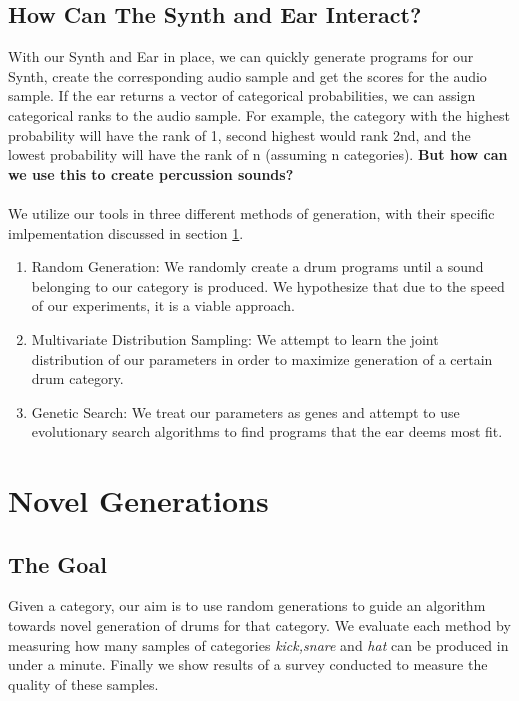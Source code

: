 \documentclass{nime-alternate} %
\begin{document}
\subsection{How Can The Synth and Ear Interact?}
With our Synth and Ear in place, we can quickly generate programs for our Synth, create the corresponding audio sample and get the scores for the audio sample. If the ear returns a vector of categorical probabilities, we can assign categorical ranks to the audio sample. For example, the category with the highest probability will have the rank of 1, second highest would rank 2nd, and the lowest probability will have the rank of n (assuming n categories).\textbf{
But how can we use this to create percussion sounds?}\\\\
We utilize our tools in three different methods of generation, with their specific imlpementation discussed in section \ref{gens}.
\begin {enumerate} [label=(\roman*)]
\item Random Generation: We randomly create a drum programs until a sound belonging to our category is produced. We hypothesize that due to the speed of our experiments, it is a viable approach.
\item Multivariate Distribution Sampling: We attempt to learn the joint distribution of our parameters in order to maximize generation of a certain drum category. 
\item Genetic Search: We treat our parameters as genes and attempt to use evolutionary search algorithms to find programs that the ear deems most fit.\\
\end {enumerate} 

\section{Novel Generations}
\label{gens}
\subsection{The Goal}
 Given a category, our aim is to use random generations to guide an algorithm towards novel generation of drums for that category. We evaluate each method by measuring how many samples of categories \textit{kick,snare} and \textit{hat} can be produced in under a minute. Finally we show results of a survey conducted to measure the quality of these samples. 
\end{document}

